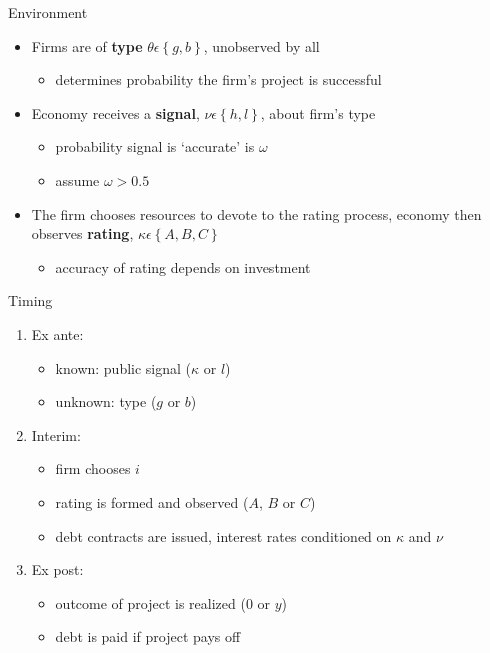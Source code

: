 \documentclass{beamer}
\begin{document}
\begin{frame}{Environment}
\begin{itemize}
	\item Firms are of \textbf{type} $\theta \epsilon \left\{g,b\right\}$, unobserved by all
	\begin{itemize}
		\item determines probability the firm's project is successful
	\end{itemize}
	\item Economy receives a \textbf{signal}, $\nu \epsilon \left\{h,l\right\}$, about firm's type
	\begin{itemize}
		\item probability signal is `accurate' is $\omega$
		\item assume $\omega > 0.5$
	\end{itemize}
	\item The firm chooses resources to devote to the rating process, economy then observes \textbf{rating}, $\kappa \epsilon \left\{A,B,C\right\}$
	\begin{itemize}
		\item accuracy of rating depends on investment
	\end{itemize}
\end{itemize}
\end{frame}

\begin{frame}{Timing}
\begin{enumerate}
	\item Ex ante:
	\begin{itemize}
		\item known: public signal ($\kappa$ or $l$)
		\item unknown: type ($g$ or $b$)
	\end{itemize}
	\item Interim:
	\begin{itemize}
		\item firm chooses $i$
		\item rating is formed and observed ($A$, $B$ or $C$)
		\item debt contracts are issued, interest rates conditioned on $\kappa$ and $\nu$
	\end{itemize}
	\item Ex post:
	\begin{itemize}
		\item outcome of project is realized (0 or $y$)
		\item debt is paid if project pays off
	\end{itemize}
\end{enumerate}
\end{frame}
\end{document}
